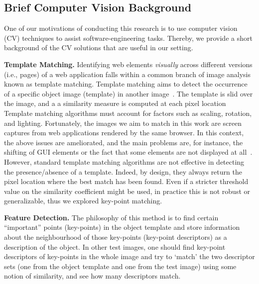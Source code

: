 
\subsection{Brief Computer Vision Background}\label{sec:cv}

One of our motivations of conducting this research is to use computer vision (CV) techniques to assist software-engineering tasks. 
Thereby, we provide a short background of the CV solutions that are useful in our setting.

\noindent
\textbf{Template Matching.}\label{sec:tm}
Identifying web elements \textit{visually} across different versions (i.e., pages) of a web application falls within a common branch of image analysis known as template matching. 
%
Template matching aims to detect the occurrence of a specific  object image (template) in another image~\cite{Brunelli:2009:TMT:1643435}. The template is slid over the image, and a a similarity measure is computed at each pixel location
%
Template matching algorithms must account for factors such as scaling, rotation, and lighting. Fortunately, the images we aim to match in this work are screen captures from web applications rendered by the same browser. In this context, the above issues are ameliorated, and the main problems are, for instance, the shifting of GUI elements or the fact that some elements are not displayed at all~\cite{}.
% 
However, standard template matching algorithms are not effective in detecting the presence/absence of a template. Indeed, by design, they always return the pixel location where the best match has been found. Even if a stricter threshold value on the similarity coefficient might be used, in practice this is not robust or generalizable, thus we explored key-point matching.

\noindent
\textbf{Feature Detection.}
The philosophy of this method is to find certain ``important'' points (key-points) in the object template and store information about the neighbourhood of those key-points (key-point descriptors) as a description of the object. In other test images, one should find key-point descriptors of key-points in the whole image and try to `match' the two descriptor sets (one from the object template and one from the test image) using some notion of similarity, and see how many descriptors match.



